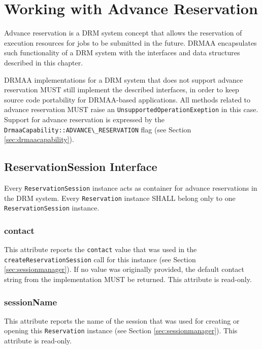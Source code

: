 \documentclass{article}
\newcommand{\h}[1]{\lstinline|#1|}
\newcommand{\rat}[1]{}
\begin{document}
\rat{The Dec. 7th 2011 conf call decided upon the addition of the JOB\_ID environment variable.}

\section{Working with Advance Reservation}

Advance reservation is a DRM system concept that allows the reservation of execution resources for jobs to be submitted in the future. DRMAA encapsulates such functionality of a DRM system with the interfaces and data structures described in this chapter.

DRMAA implementations for a DRM system that does not support advance reservation MUST still implement the described interfaces, in order to keep source code portability for DRMAA-based applications. All methods related to advance reservation MUST raise an \h{UnsupportedOperationExeption} in this case. Support for advance reservation is expressed by the \h{DrmaaCapability::ADVANCE\_RESERVATION} flag (see Section \ref{sec:drmaacapability}). 

\subsection{ReservationSession Interface}
\label{sec:reservationsession}

Every \h{ReservationSession} instance acts as container for advance reservations in the DRM system. Every \h{Reservation} instance SHALL belong only to one \h{ReservationSession} instance. 



\subsubsection{contact}

This attribute reports the \h{contact} value that was used in the \h{createReservationSession} call for this instance (see Section \ref{sec:sessionmanager}). If no value was originally provided, the default contact string from the implementation MUST be returned. This attribute is read-only.

\subsubsection{sessionName}

This attribute reports the name of the session that was used for creating or opening this \h{Reservation} instance  (see Section \ref{sec:sessionmanager}). This attribute is read-only.
\end{document}

